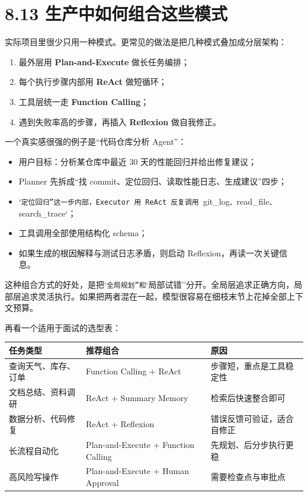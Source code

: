 \section{8.13 生产中如何组合这些模式}

实际项目里很少只用一种模式。更常见的做法是把几种模式叠加成分层架构：


\begin{enumerate}[leftmargin=2em]
\item 最外层用 \textbf{Plan-and-Execute} 做长任务编排；
\item 每个执行步骤内部用 \textbf{ReAct} 做短循环；
\item 工具层统一走 \textbf{Function Calling}；
\item 遇到失败率高的步骤，再插入 \textbf{Reflexion} 做自我修正。
\end{enumerate}

一个真实感很强的例子是``代码仓库分析 Agent''：


\begin{itemize}[leftmargin=2em]
\item 用户目标：分析某仓库中最近 30 天的性能回归并给出修复建议；
\item Planner 先拆成``找 commit、定位回归、读取性能日志、生成建议''四步；
\item `\texttt{定位回归''这一步内部，Executor 用 ReAct 反复调用 }git\_log\texttt{、}read\_file\texttt{、}search\_trace`；
\item 工具调用全部使用结构化 schema；
\item 如果生成的根因解释与测试日志矛盾，则启动 Reflexion，再读一次关键信息。
\end{itemize}

这种组合方式的好处，是把`\texttt{全局规划''和}`局部试错''分开。全局层追求正确方向，局部层追求灵活执行。如果把两者混在一起，模型很容易在细枝末节上花掉全部上下文预算。


再看一个适用于面试的选型表：


\begingroup
\scriptsize
\setlength{\tabcolsep}{3pt}
\begin{longtable}{|p{}|p{}|p{}|}
\hline
任务类型 & 推荐组合 & 原因 \\ \hline
查询天气、库存、订单 & Function Calling + ReAct & 步骤短，重点是工具稳定性 \\ \hline
文档总结、资料调研 & ReAct + Summary Memory & 检索后快速整合即可 \\ \hline
数据分析、代码修复 & ReAct + Reflexion & 错误反馈可验证，适合自修正 \\ \hline
长流程自动化 & Plan-and-Execute + Function Calling & 先规划、后分步执行更稳 \\ \hline
高风险写操作 & Plan-and-Execute + Human Approval & 需要检查点与审批点 \\ \hline
\end{longtable}
\endgroup

